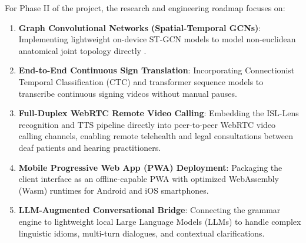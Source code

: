 For Phase II of the project, the research and engineering roadmap focuses on:
\begin{enumerate}
    \item \textbf{Graph Convolutional Networks (Spatial-Temporal GCNs)}: Implementing lightweight on-device ST-GCN models to model non-euclidean anatomical joint topology directly \cite{17}.
    \item \textbf{End-to-End Continuous Sign Translation}: Incorporating Connectionist Temporal Classification (CTC) and transformer sequence models to transcribe continuous signing videos without manual pauses.
    \item \textbf{Full-Duplex WebRTC Remote Video Calling}: Embedding the ISL-Lens recognition and TTS pipeline directly into peer-to-peer WebRTC video calling channels, enabling remote telehealth and legal consultations between deaf patients and hearing practitioners.
    \item \textbf{Mobile Progressive Web App (PWA) Deployment}: Packaging the client interface as an offline-capable PWA with optimized WebAssembly (Wasm) runtimes for Android and iOS smartphones.
    \item \textbf{LLM-Augmented Conversational Bridge}: Connecting the grammar engine to lightweight local Large Language Models (LLMs) to handle complex linguistic idioms, multi-turn dialogues, and contextual clarifications.
\end{enumerate}
